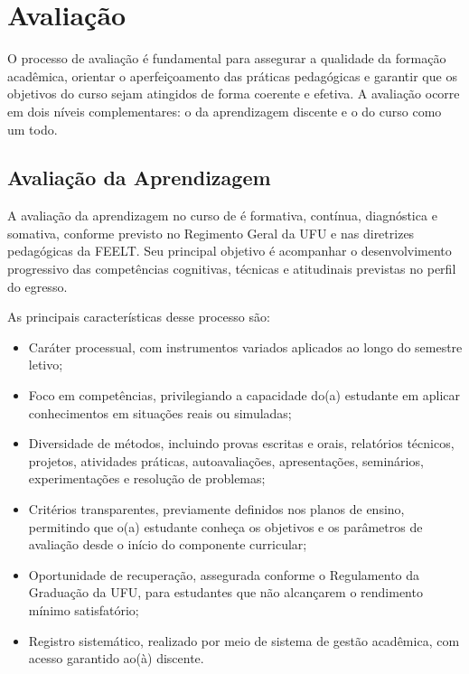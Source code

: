 \chapter{Avaliação}

O processo de avaliação é fundamental para assegurar a qualidade da formação acadêmica, orientar o aperfeiçoamento das práticas pedagógicas e garantir que os objetivos do curso sejam atingidos de forma coerente e efetiva. A avaliação ocorre em dois níveis complementares: o da aprendizagem discente e o do curso como um todo.

\section{Avaliação da Aprendizagem}

A avaliação da aprendizagem no curso de \nomecursonovo é formativa, contínua, diagnóstica e somativa, conforme previsto no Regimento Geral da UFU e nas diretrizes pedagógicas da FEELT. Seu principal objetivo é acompanhar o desenvolvimento progressivo das competências cognitivas, técnicas e atitudinais previstas no perfil do egresso.

As principais características desse processo são:

\begin{itemize}
    \item Caráter processual, com instrumentos variados aplicados ao longo do semestre letivo;
    \item Foco em competências, privilegiando a capacidade do(a) estudante em aplicar conhecimentos em situações reais ou simuladas;
    \item Diversidade de métodos, incluindo provas escritas e orais, relatórios técnicos, projetos, atividades práticas, autoavaliações, apresentações, seminários, experimentações e resolução de problemas;
    \item Critérios transparentes, previamente definidos nos planos de ensino, permitindo que o(a) estudante conheça os objetivos e os parâmetros de avaliação desde o início do componente curricular;
    \item Oportunidade de recuperação, assegurada conforme o Regulamento da Graduação da UFU, para estudantes que não alcançarem o rendimento mínimo satisfatório;
    \item Registro sistemático, realizado por meio de sistema de gestão acadêmica, com acesso garantido ao(à) discente.
\end{itemize}

